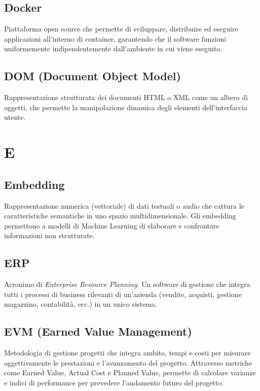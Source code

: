\documentclass[a4paper, 11pt, oneside]{scrartcl} %
\begin{document}
\subsection*{Docker}
Piattaforma open source che permette di sviluppare, distribuire ed eseguire applicazioni all'interno di container, garantendo che il software funzioni uniformemente indipendentemente dall'ambiente in cui viene eseguito.
\vspace{0.5cm}

\subsection*{DOM (Document Object Model)}
Rappresentazione strutturata dei documenti HTML o XML come un albero di oggetti, che permette la manipolazione dinamica degli elementi dell'interfaccia utente.
\vspace{0.5cm}



\section*{E}


\subsection*{Embedding}
Rappresentazione numerica (vettoriale) di dati testuali o audio che cattura le caratteristiche semantiche in uno spazio multidimensionale. Gli embedding permettono a modelli di Machine Learning di elaborare e confrontare informazioni non strutturate.
\vspace{0.5cm}

\subsection*{ERP}
Acronimo di \textit{Enterprise Resource Planning}. Un software di gestione che integra tutti i processi di business rilevanti di un'azienda (vendite, acquisti, gestione magazzino, contabilità, ecc.) in un unico sistema.
\vspace{0.5cm}

\subsection*{EVM (Earned Value Management)}
Metodologia di gestione progetti che integra ambito, tempi e costi per misurare oggettivamente le prestazioni e l'avanzamento del progetto. Attraverso metriche come Earned Value, Actual Cost e Planned Value, permette di calcolare varianze e indici di performance per prevedere l'andamento futuro del progetto.
\vspace{0.5cm}
\end{document}
